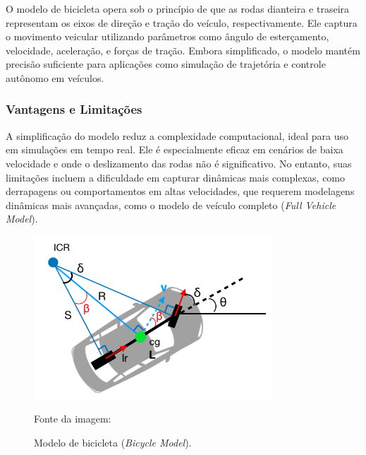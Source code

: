 O modelo de bicicleta opera sob o princípio de que as rodas dianteira e traseira representam os eixos de direção e tração do veículo, respectivamente. Ele captura o movimento veicular utilizando parâmetros como ângulo de esterçamento, velocidade, aceleração, e forças de tração. Embora simplificado, o modelo mantém precisão suficiente para aplicações como simulação de trajetória e controle autônomo em veículos.

\subsubsection{Vantagens e Limitações}

A simplificação do modelo reduz a complexidade computacional, ideal para uso em simulações em tempo real. Ele é especialmente eficaz em cenários de baixa velocidade e onde o deslizamento das rodas não é significativo. No entanto, suas limitações incluem a dificuldade em capturar dinâmicas mais complexas, como derrapagens ou comportamentos em altas velocidades, que requerem modelagens dinâmicas mais avançadas, como o modelo de veículo completo (\textit{Full Vehicle Model}).

\begin{figure}[H]
    \centering
    \includegraphics[width=0.8\textwidth]{figuras/Bicycle Model.png}
    \caption{Modelo de bicicleta (\textit{Bicycle Model}).}
    \footnotesize{Fonte da imagem: \cite{bicycleModel}}
    \label{fig:bicycle-model}
\end{figure}
\pagebreak

